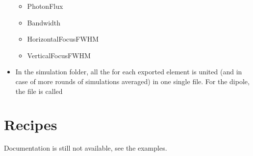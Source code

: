 \documentclass[letterpaper,10pt,english]{sphinxmanual}
\begin{document}
\begin{itemize}
\begin{itemize}
\item {} 
\sphinxAtStartPar
PhotonFlux

\item {} 
\sphinxAtStartPar
Bandwidth

\item {} 
\sphinxAtStartPar
HorizontalFocusFWHM

\item {} 
\sphinxAtStartPar
VerticalFocusFWHM

\end{itemize}

\item {} 
\sphinxAtStartPar
In the simulation folder, all the for each exported element
is united (and in case of more rounds of simulations averaged)
in one single file. For the dipole, the file is called 

\end{itemize}


\section{Recipes}
\label{\detokenize{tutorial:recipes}}
\sphinxAtStartPar
Documentation is still not available, see the examples.
\end{document}
